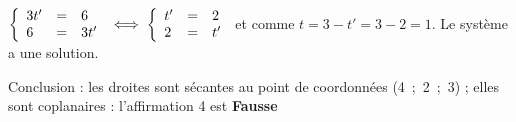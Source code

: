 $\left\{\begin{array}{l c l}
3t' &=&6 \\
6&=& 3t'
\end{array}\right. \iff \left\{\begin{array}{l c l}
t' &=&2 \\
2&=& t'
\end{array}\right.$ et comme $t = 3 - t' = 3 - 2 = 1$. Le système a une solution.

Conclusion : les droites  sont sécantes au point de coordonnées (4~;~2~;~3) ; elles sont coplanaires : l'affirmation 4 est \textbf{Fausse}
\bigskip

